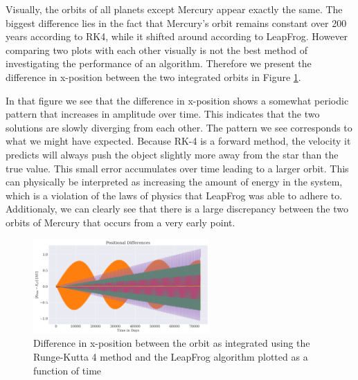 Visually, the orbits of all planets except Mercury appear exactly the same. The biggest difference lies in the fact that Mercury's orbit remains constant over 200 years according to RK4, while it shifted around according to LeapFrog. However comparing two plots with each other visually is not the best method of investigating the performance of an algorithm. Therefore we present the difference in x-position between the two integrated orbits in Figure \ref{fig:orbits_diff}. 

In that figure we see that the difference in x-position shows a somewhat periodic pattern that increases in amplitude over time. This indicates that the two solutions are slowly diverging from each other. The pattern we see corresponds to what we might have expected. Because RK-4 is a forward method, the velocity it predicts will always push the object slightly more away from the star than the true value. This small error accumulates over time leading to a larger orbit. This can physically be interpreted as increasing the amount of energy in the system, which is a violation of the laws of physics that LeapFrog was able to adhere to. Additionaly, we can clearly see that there is a large discrepancy between the two orbits of Mercury that occurs from a very early point.

\begin{figure}
    \centering
    \includegraphics[width=0.6\textwidth]{results/rk4_lf_diff.png}
    \caption{Difference in x-position between the orbit as integrated using the Runge-Kutta 4 method and the LeapFrog algorithm plotted as a function of time}
    \label{fig:orbits_diff}
\end{figure}









